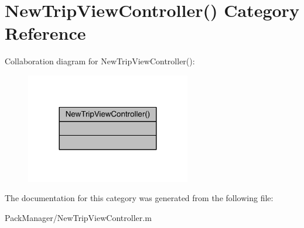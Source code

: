 \hypertarget{category_new_trip_view_controller_07_08}{\section{New\-Trip\-View\-Controller() Category Reference}
\label{category_new_trip_view_controller_07_08}
}


Collaboration diagram for New\-Trip\-View\-Controller()\-:\nopagebreak
\begin{figure}[H]
\begin{center}
\leavevmode
\includegraphics[width=204pt]{category_new_trip_view_controller_07_08__coll__graph}
\end{center}
\end{figure}


The documentation for this category was generated from the following file\-:\begin{DoxyCompactItemize}
\item 
Pack\-Manager/New\-Trip\-View\-Controller.\-m\end{DoxyCompactItemize}
